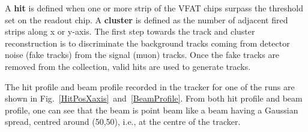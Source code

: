 A \textbf{hit} is defined when one or more strip of the VFAT chips surpass the threshold set on the readout chip. 
A \textbf{cluster} is defined as the number of adjacent fired strips along x or y-axis. The first step towards the track and cluster reconstruction is to discriminate the background tracks coming from detector noise (fake tracks) from the signal (muon) tracks. Once the fake tracks are removed from the collection, valid hits are used to generate tracks.

The hit profile and beam profile recorded in the tracker for one of the runs are shown in Fig.~\ref{HitPosXaxis}~and~\ref{BeamProfile}.
From both hit profile and beam profile, one can see that the beam is point beam like a beam having a Gaussian spread, centred around (50,50), i.e., at the centre of the tracker.

